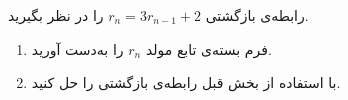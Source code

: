     \p 
رابطه‌ی بازگشتی
$r_n = 3r_{n-1} + 2$
را در نظر بگیرید.
\begin{enumerate}
\item
فرم بسته‌ی تابع مولد
$r_n$
را به‌دست آورید.
\item
با استفاده از بخش قبل رابطه‌ی بازگشتی را حل کنید.
\end{enumerate}